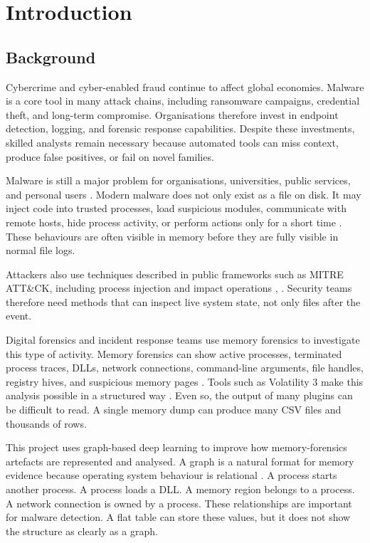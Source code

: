 \chapter{Introduction}

\section{Background}

Cybercrime and cyber-enabled fraud continue to affect global economies. Malware is a core tool in many attack chains, including ransomware campaigns, credential theft, and long-term compromise. Organisations therefore invest in endpoint detection, logging, and forensic response capabilities. Despite these investments, skilled analysts remain necessary because automated tools can miss context, produce false positives, or fail on novel families.

Malware is still a major problem for organisations, universities, public services, and personal users \cite{ucci2019survey}. Modern malware does not only exist as a file on disk. It may inject code into trusted processes, load suspicious modules, communicate with remote hosts, hide process activity, or perform actions only for a short time \cite{egele2012survey}. These behaviours are often visible in memory before they are fully visible in normal file logs.

Attackers also use techniques described in public frameworks such as MITRE ATT\&CK, including process injection and impact operations \cite{mitre2026enterprise}, \cite{mitre2026t1055}. Security teams therefore need methods that can inspect live system state, not only files after the event.

Digital forensics and incident response teams use memory forensics to investigate this type of activity. Memory forensics can show active processes, terminated process traces, DLLs, network connections, command-line arguments, file handles, registry hives, and suspicious memory pages \cite{ligh2014art}. Tools such as Volatility 3 make this analysis possible in a structured way \cite{volatility3docs}. Even so, the output of many plugins can be difficult to read. A single memory dump can produce many CSV files and thousands of rows.

This project uses graph-based deep learning to improve how memory-forensics artefacts are represented and analysed. A graph is a natural format for memory evidence because operating system behaviour is relational \cite{russinovich2017internals1}. A process starts another process. A process loads a DLL. A memory region belongs to a process. A network connection is owned by a process. These relationships are important for malware detection. A flat table can store these values, but it does not show the structure as clearly as a graph.

